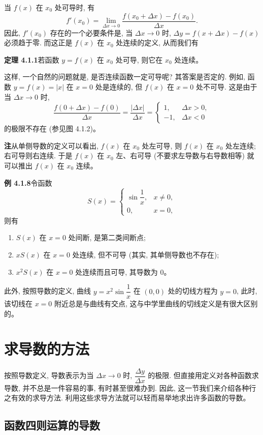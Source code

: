 \documentclass[UTF8,12pt,a4paper,fontset=fandol]{ctexart}
\begin{document}
当 $f(x)$ 在 $x_0$ 处可导时, 有
\[
  f'(x_0)=
  \lim_{\Delta x\to0}
  \frac{f(x_0+\Delta x)-f(x_0)}{\Delta x}.
\]
因此, $f'(x_0)$ 存在的一个必要条件是, 当 $\Delta x\to0$ 时, $\Delta y=f(x+\Delta x)-f(x)$ 必须趋于零. 而这正是 $f(x)$ 在 $x_0$ 处连续的定义, 从而我们有

\noindent\textbf{定理 4.1.1}\quad 若函数 $y=f(x)$ 在 $x_0$ 处可导, 则它在 $x_0$ 处连续。

这样, 一个自然的问题就是, 是否连续函数一定可导呢? 其答案是否定的. 例如, 函数 $y=f(x)=|x|$ 在 $x=0$ 处是连续的, 但 $f(x)$ 在 $x=0$ 处不可导. 这是由于当 $\Delta x\to0$ 时,
\[
  \frac{f(0+\Delta x)-f(0)}{\Delta x}
  =
  \frac{|\Delta x|}{\Delta x}
  =
  \begin{cases}
    1, & \Delta x>0,\\
    -1, & \Delta x<0
  \end{cases}
\]
的极限不存在 (参见图 4.1.2)。

\noindent\textbf{注}\quad 从单侧导数的定义可以看出, $f(x)$ 在 $x_0$ 处左可导, 则 $f(x)$ 在 $x_0$ 处左连续; 右可导则右连续. 于是 $f(x)$ 在 $x_0$ 左、右可导 (不要求左导数与右导数相等) 就可以推出 $f(x)$ 在 $x_0$ 连续。

\noindent\textbf{例 4.1.8}\quad 令函数
\[
  S(x)=
  \begin{cases}
    \sin\dfrac1x, & x\ne0,\\
    0, & x=0,
  \end{cases}
\]
则有
\begin{enumerate}
  \item $S(x)$ 在 $x=0$ 处间断, 是第二类间断点;
  \item $xS(x)$ 在 $x=0$ 处连续, 但不可导 (其实, 其单侧导数也不存在);
  \item $x^2S(x)$ 在 $x=0$ 处连续而且可导, 其导数为 $0$。
\end{enumerate}
此外, 按照导数的定义, 曲线 $y=x^2\sin\dfrac1x$ 在 $(0,0)$ 处的切线方程为 $y=0$, 此时, 该切线在 $x=0$ 附近总是与曲线有交点, 这与中学里曲线的切线定义是有很大区别的。

\section{求导数的方法}

按照导数定义, 导数表示为当 $\Delta x\to0$ 时, $\dfrac{\Delta y}{\Delta x}$ 的极限. 但直接用定义对各种函数求导数, 并不总是一件容易的事, 有时甚至很难办到. 因此, 这一节我们来介绍各种行之有效的求导方法. 利用这些求导方法就可以轻而易举地求出许多函数的导数。

\subsection{函数四则运算的导数}
\end{document}
